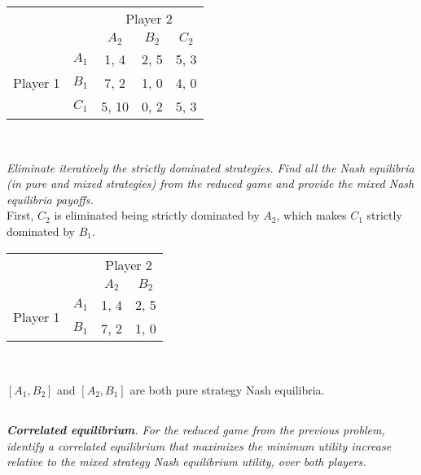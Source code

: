 \documentclass[12pt]{amsart}
\begin{document}
\begin{center}
	\def\arraystretch{1.25}%
	\begin{tabular}{ccccc}
		&                            & \multicolumn{3}{c}{Player 2}                                                         \\
		& \multicolumn{1}{c|}{}      & \multicolumn{1}{c|}{$A_2$} & \multicolumn{1}{c|}{$B_2$} & \multicolumn{1}{c|}{$C_2$} \\ \cline{2-5} 
		& \multicolumn{1}{c|}{$A_1$} & \multicolumn{1}{c|}{1, 4}  & \multicolumn{1}{c|}{2, 5}  & \multicolumn{1}{c|}{5, 3}  \\ \cline{2-5} 
		Player 1 & \multicolumn{1}{c|}{$B_1$} & \multicolumn{1}{c|}{7, 2}  & \multicolumn{1}{c|}{1, 0}  & \multicolumn{1}{c|}{4, 0}  \\ \cline{2-5} 
		& \multicolumn{1}{c|}{$C_1$} & \multicolumn{1}{c|}{5, 10} & \multicolumn{1}{c|}{0, 2}  & \multicolumn{1}{c|}{5, 3}  \\ \cline{2-5} 
	\end{tabular} \\[2ex]
\end{center}

\textit{Eliminate iteratively the strictly dominated strategies. Find all the Nash equilibria (in pure
	and mixed strategies) from the reduced game and provide the mixed Nash equilibria
	payoffs.} \\
	
	First, $C_2$ is eliminated being strictly dominated by $A_2$,
	which makes $C_1$ strictly dominated by $B_1$.

	\begin{center}
		\def\arraystretch{1.25}%
		\begin{tabular}{cccc}
			&                            & \multicolumn{2}{c}{Player 2}                            \\
			& \multicolumn{1}{c|}{}      & \multicolumn{1}{c|}{$A_2$} & \multicolumn{1}{c|}{$B_2$} \\ \cline{2-4} 
			\multirow{2}{*}{Player 1} & \multicolumn{1}{c|}{$A_1$} & \multicolumn{1}{c|}{1, 4}  & \multicolumn{1}{c|}{2, 5}  \\ \cline{2-4} 
			& \multicolumn{1}{c|}{$B_1$} & \multicolumn{1}{c|}{7, 2}  & \multicolumn{1}{c|}{1, 0}  \\ \cline{2-4} 
		\end{tabular} \\[1ex]
	\end{center}
	
	$[A_1,B_2]$ and $[A_2,B_1]$ are both pure strategy Nash equilibria.
	
	

\subsection{}
\textit{\textbf{Correlated equilibrium}. For the reduced game from the previous problem, identify a
	correlated equilibrium that maximizes the minimum utility increase relative to the mixed strategy Nash equilibrium utility, over both players.}
\end{document}
